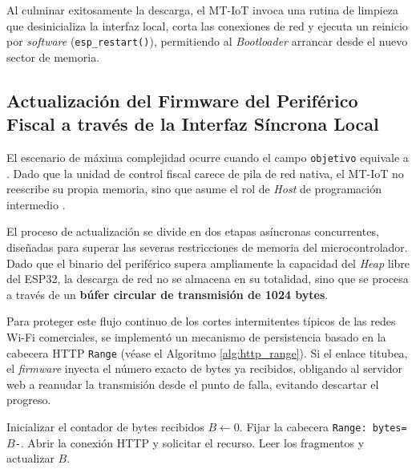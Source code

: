 \par Al culminar exitosamente la descarga, el MT-IoT invoca una rutina de limpieza que desinicializa la interfaz local, corta las conexiones de red y ejecuta un reinicio por \textit{software} (\texttt{esp\_restart()}), permitiendo al \textit{Bootloader} arrancar desde el nuevo sector de memoria.

\subsection{Actualización del Firmware del Periférico Fiscal a través de la Interfaz Síncrona Local}

\par El escenario de máxima complejidad ocurre cuando el campo \texttt{objetivo} equivale a . Dado que la unidad de control fiscal carece de pila de red nativa, el MT-IoT no reescribe su propia memoria, sino que asume el rol de \textit{Host} de programación intermedio \cite{TheFactoryHKA_Manual_Protocolos}.\\

\par El proceso de actualización se divide en dos etapas asíncronas concurrentes, diseñadas para superar las severas restricciones de memoria del microcontrolador. Dado que el binario del periférico supera ampliamente la capacidad del \textit{Heap} libre del ESP32, la descarga de red no se almacena en su totalidad, sino que se procesa a través de un \textbf{búfer circular de transmisión de 1024 bytes}.\\

\par Para proteger este flujo continuo de los cortes intermitentes típicos de las redes Wi-Fi comerciales, se implementó un mecanismo de persistencia basado en la cabecera HTTP \texttt{Range} (véase el Algoritmo \ref{alg:http_range}). Si el enlace titubea, el \textit{firmware} inyecta el número exacto de bytes ya recibidos, obligando al servidor web a reanudar la transmisión desde el punto de falla, evitando descartar el progreso.\\

\begin{algorithm}[htbp]
\caption{Reanudación de descargas interrumpidas mediante cabeceras HTTP Range.}
\label{alg:http_range}
\begin{algorithmic}[1]
\State Inicializar el contador de bytes recibidos $B \leftarrow 0$.
        \State Fijar la cabecera \texttt{Range: bytes=}$B$\texttt{-}.
    \EndIf
    \State Abrir la conexión HTTP y solicitar el recurso.
    \State Leer los fragmentos y actualizar $B$.
\EndWhile
\end{algorithmic}
\end{algorithm}

